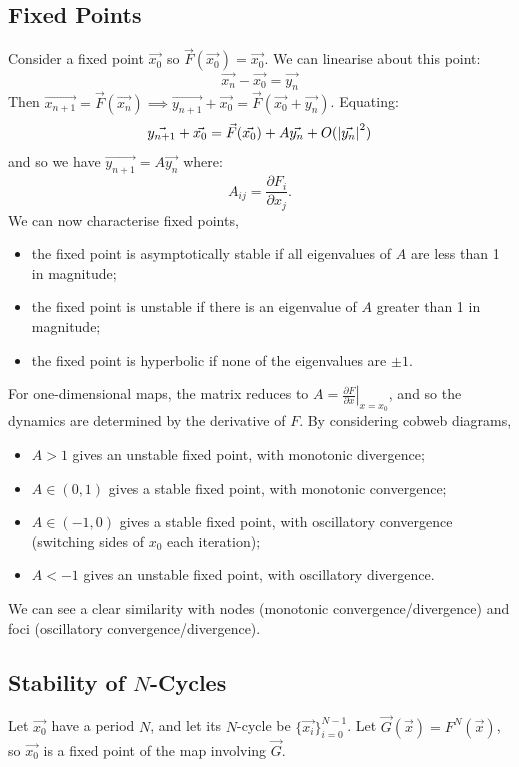 \documentclass[../Main.tex]{subfiles}
\begin{document}
\subsection{Fixed Points}
Consider a fixed point $\vec{x_0}$ so $\vec{F}(\vec{x_0}) = \vec{x_0}$. We can linearise about this point:
\begin{equation*}
    \vec{x_n} - \vec{x_0} = \vec{y_n}
\end{equation*}
Then $\vec{x_{n+1}} = \vec{F}(\vec{x_n}) \implies \vec{y_{n+1}} + \vec{x_0} = \vec{F}(\vec{x_0} + \vec{y_n})$. Equating:
\begin{equation*}
    \vec{y_{n+1}} + \vec{x_0} = \vec F(\vec{x_0}) + A \vec{y_n} + O(\left|\vec{y_n}\right|^2)
\end{equation*}
and so we have $\vec{y_{n+1}} = A\vec{y_n}$ where:
\begin{equation*}
    A_{ij} = \frac{\partial F_i}{\partial x_j}.
\end{equation*}
We can now characterise fixed points,
\begin{itemize}
    \item the fixed point is asymptotically stable if all eigenvalues of $A$ are less than 1 in magnitude;
    \item the fixed point is unstable if there is an eigenvalue of $A$ greater than 1 in magnitude;
    \item the fixed point is hyperbolic if none of the eigenvalues are $\pm 1$.
\end{itemize}
For one-dimensional maps, the matrix reduces to $A = \left.\frac{\partial F}{\partial x}\right|_{x = x_0}$, and so the dynamics are determined by the derivative of $F$. By considering cobweb diagrams,
\begin{itemize}
    \item $A > 1$ gives an unstable fixed point, with monotonic divergence;
    \item $A \in (0, 1)$ gives a stable fixed point, with monotonic convergence;
    \item $A \in (-1, 0)$ gives a stable fixed point, with oscillatory convergence (switching sides of $x_0$ each iteration);
    \item $A < -1$ gives an unstable fixed point, with oscillatory divergence.
\end{itemize}
We can see a clear similarity with nodes (monotonic convergence/divergence) and foci (oscillatory convergence/divergence).
\subsection{Stability of \texorpdfstring{$N$}{N}-Cycles}
Let $\vec{x_0}$ have a period $N$, and let its $N$-cycle be $\{\vec{x_i}\}_{i = 0}^{N-1}$. Let $\vec G(\vec x) = F^N(\vec x)$, so $\vec{x_0}$ is a fixed point of the map involving $\vec G$.
\end{document}
